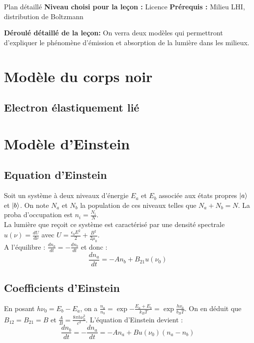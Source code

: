 \begin{reportBlock}{Plan détaillé}
  \textbf{Niveau choisi pour la leçon :} Licence
  \newline
  \textbf{Prérequis : }Milieu LHI, distribution de Boltzmann
  \newline
  
  \textbf{Déroulé détaillé de la leçon: }   \newline
On verra deux modèles qui permettront d'expliquer le phénomène d'émission et absorption de la lumière dans les milieux.
  \section{Modèle du corps noir}
  
  \subsection{Electron élastiquement lié}


\section{Modèle d'Einstein}
\subsection{Equation d'Einstein}
Soit un système à deux niveaux d'énergie $E_a$ et $E_b$ associée aux états propres $\ket{a}$ et $\ket{b}$. On note $N_a$ et $N_b$ la population de ces niveaux telles que $N_a+N_b=N$. La proba d'occupation est $n_i=\frac{N_i}{N}$.\\
La lumière que reçoit ce système est caractérisé par une densité spectrale $u(\nu)=\frac{dU}{d\nu}$ avec $U=\frac{\epsilon_0E^2}{2}+\frac{B^2}{2\mu_0}$.\\


A l'équilibre : $\frac{dn_a}{dt}=-\frac{dn_b}{dt}$ et donc : 
\begin{equation}
    \frac{dn_a}{dt} = -An_b + B_{21}u(\nu_0)
\end{equation}
\subsection{Coefficients d'Einstein}

En posant $h\nu_0 = E_b - E_a$, on a $\frac{n_a}{n_b}=\exp{-\frac{E_a+E_b}{k_BT}} = \exp{\frac{h\nu_0}{b_BT}}$. On en déduit que $B_{12} = B_{21} = B$ et $\frac{A}{B}=\frac{8\pi h\nu_0^3}{c^3}$. L'équation d'Einstein devient : 
\begin{equation}
    \frac{dn_b}{dt} = -\frac{dn_a}{dt} = -An_a + Bu(\nu_0)(n_a-n_b)
\end{equation}


\end{reportBlock}
